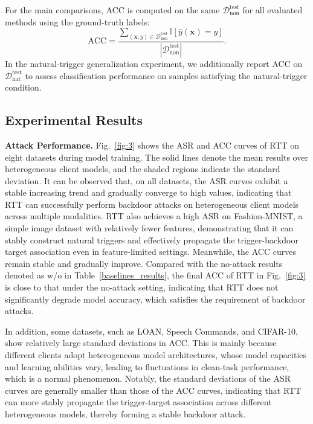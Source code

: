 \documentclass[lettersize,journal]{IEEEtran}
\begin{document}
{For the main comparisons, ACC is computed on the same $\mathcal{D}_{\mathrm{non}}^{\mathrm{test}}$ for all evaluated methods using the ground-truth labels:
\begin{equation}
\mathrm{ACC}
=
\frac{
\sum_{(\mathbf{x},y)\in\mathcal{D}_{\mathrm{non}}^{\mathrm{test}}}
\mathbb{I}[\hat{y}(\mathbf{x})=y]
}{
|\mathcal{D}_{\mathrm{non}}^{\mathrm{test}}|
}.
\end{equation}
In the natural-trigger generalization experiment, we additionally report ACC on $\mathcal{D}_{\mathrm{nat}}^{\mathrm{test}}$ to assess classification performance on samples satisfying the natural-trigger condition.}


\subsection{Experimental Results}
\textbf{Attack Performance.}
Fig.~\ref{fig:3} shows the ASR and ACC curves of RTT on eight datasets during model training.
The solid lines denote the mean results over heterogeneous client models, and the shaded regions indicate the standard deviation.
It can be observed that, on all datasets, the ASR curves exhibit a stable increasing trend and gradually converge to high values, indicating that RTT can successfully perform backdoor attacks on heterogeneous client models across multiple modalities.
RTT also achieves a high ASR on Fashion-MNIST, a simple image dataset with relatively fewer features, demonstrating that it can stably construct natural triggers and effectively propagate the trigger-backdoor target association even in feature-limited settings.
Meanwhile, the ACC curves remain stable and gradually improve. Compared with the no-attack results denoted as w/o in Table~\ref{baselines_results}, the final ACC of RTT in Fig.~\ref{fig:3} is close to that under the no-attack setting, indicating that RTT does not significantly degrade model accuracy, which satisfies the requirement of backdoor attacks.

In addition, some datasets, such as LOAN, Speech Commands, and CIFAR-10, show relatively large standard deviations in ACC.
This is mainly because different clients adopt heterogeneous model architectures, whose model capacities and learning abilities vary, leading to fluctuations in clean-task performance, which is a normal phenomenon.
Notably, the standard deviations of the ASR curves are generally smaller than those of the ACC curves, indicating that RTT can more stably propagate the trigger-target association across different heterogeneous models, thereby forming a stable backdoor attack.
\end{document}
